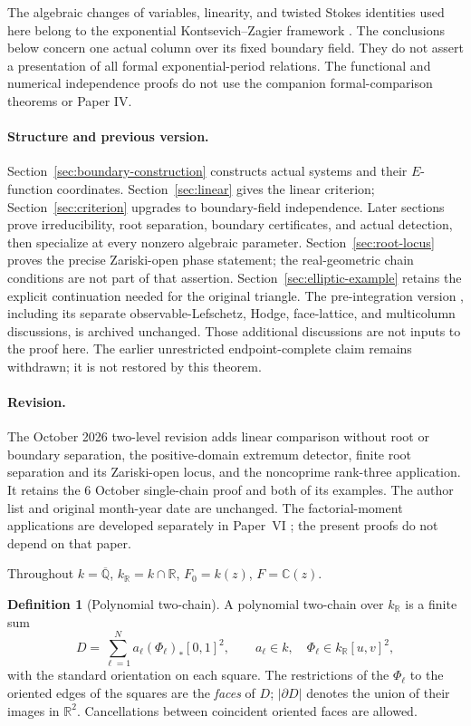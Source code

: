 \documentclass[11pt]{article}
\numberwithin{equation}{section}
\theoremstyle{definition}
\newtheorem{definition}[definition]{Definition}
\theoremstyle{remark}
\newcommand{\C}{\mathbb C}
\newcommand{\Qbar}{\overline{\mathbb Q}}
\newcommand{\R}{\mathbb R}
\begin{document}
The algebraic changes of variables, linearity, and twisted Stokes identities
used here belong to the exponential Kontsevich--Zagier framework
\cite{KontsevichZagier,CommelinHabeggerHuber}. The conclusions below concern
one actual column over its fixed boundary field. They do not assert a
presentation of all formal exponential-period relations. The functional and
numerical independence proofs do not use the companion formal-comparison
theorems or Paper IV.

\paragraph{Structure and previous version.}
Section~\ref{sec:boundary-construction} constructs actual systems and their
$E$-function coordinates. Section~\ref{sec:linear} gives the linear criterion;
Section~\ref{sec:criterion} upgrades to boundary-field independence. Later
sections prove irreducibility, root separation, boundary certificates, and
actual detection, then specialize at every nonzero algebraic parameter.
Section~\ref{sec:root-locus} proves the precise Zariski-open phase statement;
the real-geometric chain conditions are not part of that assertion. Section~\ref{sec:elliptic-example}
retains the explicit continuation needed for the original triangle.
The pre-integration version \cite{PaperVPrevious}, including its separate
observable-Lefschetz, Hodge, face-lattice, and multicolumn discussions, is
archived unchanged. Those additional discussions are not inputs to the
proof here. The earlier unrestricted endpoint-complete claim remains
withdrawn; it is not restored by this theorem.

\paragraph{Revision.} The October 2026 two-level revision adds linear
comparison without root or boundary separation, the positive-domain extremum
detector, finite root separation and its Zariski-open locus, and the noncoprime
rank-three application. It retains the 6 October single-chain proof and both
of its examples. The author list and original month-year date are unchanged.
The factorial-moment applications are developed separately in Paper~VI
\cite{PaperVI}; the present proofs do not depend on that paper.



Throughout $k=\Qbar$, $k_\R=k\cap\R$, $F_0=k(z)$, $F=\C(z)$.

\begin{definition}[Polynomial two-chain]\label{def:polynomial-chain}
A polynomial two-chain over $k_\R$ is a finite sum
\[
 D=\sum_{\ell=1}^N a_\ell(\Phi_\ell)_*[0,1]^2,
 \qquad a_\ell\in k,\quad
 \Phi_\ell\in k_\R[u,v]^2,
\]
with the standard orientation on each square.  The restrictions of the
$\Phi_\ell$ to the oriented edges of the squares are the \emph{faces} of
$D$; $|\partial D|$ denotes the union of their images in $\R^2$.
Cancellations between coincident oriented faces are allowed.
\end{definition}
\end{document}
